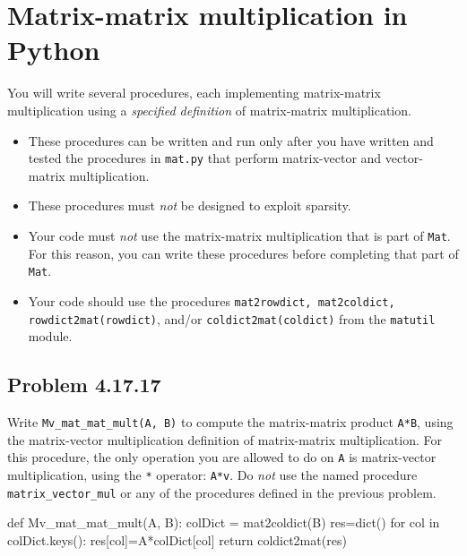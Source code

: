 \documentclass[
  letterpaper,
  DIV=11,
  numbers=noendperiod]{scrartcl}
\newenvironment{Shaded}{\begin{snugshade}}{\end{snugshade}}
\newcommand{\BuiltInTok}[1]{\textcolor[rgb]{0.00,0.23,0.31}{#1}}
\newcommand{\ControlFlowTok}[1]{\textcolor[rgb]{0.00,0.23,0.31}{#1}}
\newcommand{\KeywordTok}[1]{\textcolor[rgb]{0.00,0.23,0.31}{#1}}
\newcommand{\NormalTok}[1]{\textcolor[rgb]{0.00,0.23,0.31}{#1}}
\newcommand{\OperatorTok}[1]{\textcolor[rgb]{0.37,0.37,0.37}{#1}}
\begin{document}
\newpage{}

\hypertarget{matrix-matrix-multiplication-in-python}{%
\section{Matrix-matrix multiplication in
Python}\label{matrix-matrix-multiplication-in-python}}

You will write several procedures, each implementing matrix-matrix
multiplication using a \emph{specified definition} of matrix-matrix
multiplication.

\begin{itemize}
\item These procedures can be written and run only after you have written and tested the procedures in \verb|mat.py| that perform matrix-vector and vector-matrix multiplication.
\item These procedures must \textit{not} be designed to exploit sparsity.
\item Your code must \textit{not} use the matrix-matrix multiplication that is part of \verb|Mat|. For this reason, you can write these procedures before completing that part of \verb|Mat|.
\item Your code should use the procedures \verb|mat2rowdict, mat2coldict, rowdict2mat(rowdict)|, and/or \verb|coldict2mat(coldict)| from the \verb|matutil| module.
\end{itemize}

\hypertarget{problem-4.17.17}{%
\subsection{Problem 4.17.17}\label{problem-4.17.17}}

Write \texttt{Mv\_mat\_mat\_mult(A,\ B)} to compute the matrix-matrix
product \texttt{A*B}, using the matrix-vector multiplication definition
of matrix-matrix multiplication. For this procedure, the only operation
you are allowed to do on \texttt{A} is matrix-vector multiplication,
using the \texttt{*} operator: \texttt{A*v}. Do \emph{not} use the named
procedure \texttt{matrix\_vector\_mul} or any of the procedures defined
in the previous problem.

\begin{Shaded}
\begin{Highlighting}[numbers=left,,]
\KeywordTok{def}\NormalTok{ Mv\_mat\_mat\_mult(A, B):}
\NormalTok{  colDict }\OperatorTok{=}\NormalTok{ mat2coldict(B)}
\NormalTok{  res}\OperatorTok{=}\BuiltInTok{dict}\NormalTok{()}
  \ControlFlowTok{for}\NormalTok{ col }\KeywordTok{in}\NormalTok{ colDict.keys():}
\NormalTok{      res[col]}\OperatorTok{=}\NormalTok{A}\OperatorTok{*}\NormalTok{colDict[col]}
  \ControlFlowTok{return}\NormalTok{ coldict2mat(res)}
\end{Highlighting}
\end{Shaded}
\end{document}
